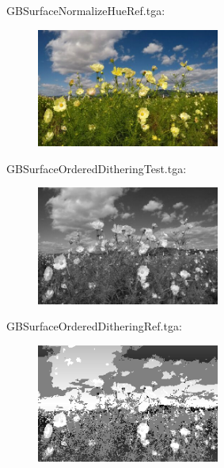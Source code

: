 GBSurfaceNormalizeHueRef.tga:\\
\begin{center}
\begin{figure}[H]
\centering\includegraphics[width=6cm]{./GBSurfaceNormalizeHueRef.png}\\
\end{figure}
\end{center}

GBSurfaceOrderedDitheringTest.tga:\\
\begin{center}
\begin{figure}[H]
\centering\includegraphics[width=6cm]{./GBSurfaceOrderedDitheringTest.png}\\
\end{figure}
\end{center}

GBSurfaceOrderedDitheringRef.tga:\\
\begin{center}
\begin{figure}[H]
\centering\includegraphics[width=6cm]{./GBSurfaceOrderedDitheringRef.png}\\
\end{figure}
\end{center}

